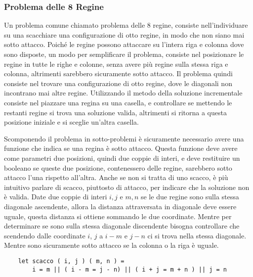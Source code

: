 \documentclass{article}
\numberwithin{equation}{subsection}
\begin{document}
\subsubsection{Problema delle 8 Regine}

Un problema comune chiamato problema delle 8 regine, consiste nell'individuare su una scacchiare una configurazione di otto regine, in modo che non siano mai sotto attacco. Poiché le regine possono attaccare su l'intera riga e colonna dove sono disposte, un modo per semplificare il problema, consiste nel posizionare le regine in tutte le righe e colonne, senza avere più regine sulla stessa riga e colonna, altrimenti sarebbero sicuramente sotto attacco. 
Il problema quindi consiste nel trovare una configurazione di otto regine, dove le diagonali non incontrano mai altre regine. 
Utilizzando il metodo della soluzione incrementale consiste nel piazzare una regina su una casella, e controllare se mettendo le restanti regine si trova una soluzione valida, altrimenti si ritorna a questa posizione iniziale e si sceglie un'altra casella. 

Scomponendo il problema in sotto-problemi è sicuramente necessario avere una funzione che indica se una regina è sotto attacco. Questa funzione deve avere come parametri due posizioni, quindi due coppie di interi, e deve restituire un booleano se queste due posizione, contenessero delle regine, sarebbero sotto attacco l'una rispetto all'altra. Anche se non si tratta di uno scacco, è più intuitivo parlare di scacco, piuttosto di attacco, per indicare che la soluzione non è valida. 
Date due coppie di interi $i,j$ e $m,n$ se le due regine sono sulla stessa diagonale ascendente, allora la distanza attraversata in diagonale deve essere uguale, questa distanza si ottiene sommando le due coordinate. Mentre per determinare se sono sulla stessa diagonale discendente bisogna controllare che scendendo dalle coordinate $i$, $j$ a $i-m$ e $j-n$ ci si trova nella stessa diagonale. 
Mentre sono sicuramente sotto attacco se la colonna o la riga è uguale. 
\begin{verbatim}
    let scacco ( i, j ) ( m, n ) =
        i = m || ( i - m = j - n) || ( i + j = m + n ) || j = n
\end{verbatim}
\end{document}
